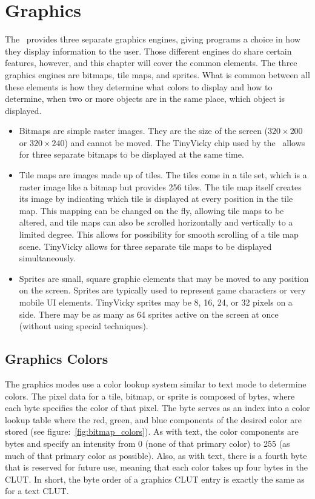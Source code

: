 \chapter{Graphics}

The \jr\ provides three separate graphics engines, giving programs a choice in how they display information to the user. Those different engines do share certain features, however, and this chapter will cover the common elements. The three graphics engines are bitmaps, tile maps, and sprites. What is common between all these elements is how they determine what colors to display and how to determine, when two or more objects are in the same place, which object is displayed.

\begin{itemize}
    \item Bitmaps are simple raster images. They are the size of the screen ($320 \times 200$ or $320 \times 240$) and cannot be moved. The TinyVicky chip used by the \jr\ allows for three separate bitmaps to be displayed at the same time.

    \item Tile maps are images made up of tiles. The tiles come in a tile set, which is a raster image like a bitmap but provides 256 tiles. The tile map itself creates its image by indicating which tile is displayed at every position in the tile map. This mapping can be changed on the fly, allowing tile maps to be altered, and tile maps can also be scrolled horizontally and vertically to a limited degree. This allows for possibility for smooth scrolling of a tile map scene. TinyVicky allows for three separate tile maps to be displayed simultaneously.

    \item Sprites are small, square graphic elements that may be moved to any position on the screen. Sprites are typically used to represent game characters or very mobile UI elements. TinyVicky sprites may be 8, 16, 24, or 32 pixels on a side. There may be as many as 64 sprites active on the screen at once (without using special techniques).
\end{itemize}

\section*{Graphics Colors}

The graphics modes use a color lookup system similar to text mode to determine colors. The pixel data for a tile, bitmap, or sprite is composed of bytes, where each byte specifies the color of that pixel. The byte serves as an index into a color lookup table where the red, green, and blue components of the desired color are stored (see figure:~\ref{fig:bitmap_colors}). As with text, the color components are bytes and specify an intensity from 0 (none of that primary color) to 255 (as much of that primary color as possible). Also, as with text, there is a fourth byte that is reserved for future use, meaning that each color takes up four bytes in the CLUT. In short, the byte order of a graphics CLUT entry is exactly the same as for a text CLUT.


